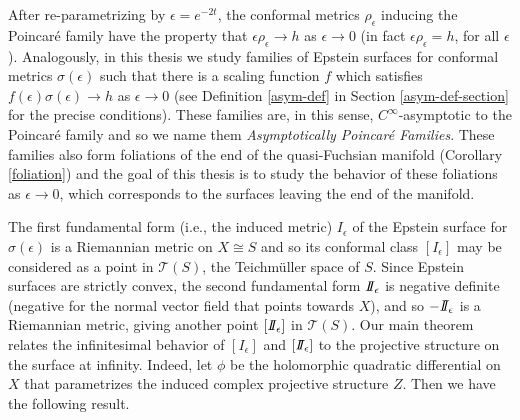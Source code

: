 After re-parametrizing by $\epsilon = e^{-2t}$, the conformal metrics $\rho_\epsilon$ inducing the Poincar\'e family have the property that $\epsilon \rho_\epsilon \to h$ as $\epsilon \to 0$ (in fact $\epsilon \rho_\epsilon = h$, for all $\epsilon$). 
Analogously, in this thesis we study families of Epstein surfaces for conformal metrics $\sigma(\epsilon)$ such that there is a scaling function $f$ which satisfies $f(\epsilon)\sigma(\epsilon) \to h$ as $\epsilon \to 0$ (see Definition \ref{asym-def} in Section \ref{asym-def-section} for the precise conditions). 
These families are, in this sense, $C^\infty$-asymptotic to the Poincar\'e family and so we name them \emph{Asymptotically Poincar\'e Families}. 
These families also form foliations of the end of the quasi-Fuchsian manifold  (Corollary \ref{foliation}) and the goal of this thesis is to study the behavior of these foliations as $ \epsilon \to 0$, which corresponds to the surfaces leaving the end of the manifold. 

The first fundamental form (i.e., the induced metric) $I_\epsilon$ of the Epstein surface for $\sigma(\epsilon)$ is a Riemannian metric on $X \cong S$ and so its conformal class $[I_\epsilon]$ may be considered as a point in $\mathcal{T}(S)$, the Teichm\"uller space of $S$. 
Since Epstein surfaces are strictly convex, the second fundamental form $I\!\!I_\epsilon$ is negative definite (negative for the normal vector field that points towards $X$), and so $-I\!\!I_\epsilon$ is a Riemannian metric, giving another point $[I\!\!I_\epsilon]$ in $\mathcal{T}(S)$.
Our main theorem relates the infinitesimal behavior of $[I_\epsilon]$ and $[I\!\!I_\epsilon]$ to the projective structure on the surface at infinity.
Indeed, let $\phi$ be the holomorphic quadratic differential on $X$ that parametrizes the induced complex projective structure $Z$.
Then we have the following result. 

